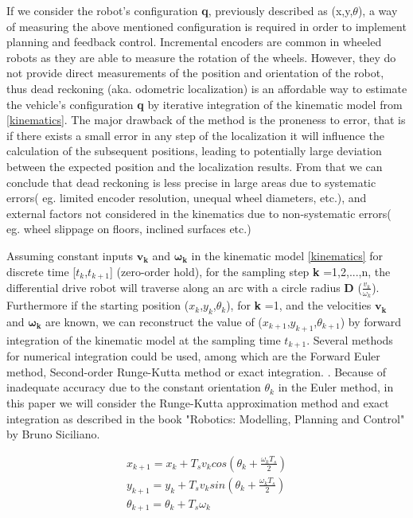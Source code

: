 If we consider the robot's configuration \textbf{q}, previously described as (x,y,$\theta$), a way of measuring the above mentioned configuration is required in order to implement planning and feedback control. Incremental encoders are common in wheeled robots as they are able to measure the rotation of the wheels. However, they do not provide direct measurements of the position and orientation of the robot, thus dead reckoning (aka. odometric localization) is an affordable way to estimate the vehicle's configuration \textbf{q} by iterative integration of the kinematic model from \ref{kinematics}. The major drawback of the method is the proneness to error, that is if there exists a small error in any step of the localization it will influence the calculation of the subsequent positions, leading to potentially large deviation between the expected position and the localization results. From that we can conclude that dead reckoning is less precise in large areas due to systematic errors( eg. limited encoder resolution, unequal wheel diameters, etc.), and external factors not considered in the kinematics due to non-systematic errors( eg. wheel slippage on floors, inclined surfaces etc.) 

Assuming constant inputs $\boldsymbol{v_k}$ and $\boldsymbol{\omega_k}$ in the kinematic model \ref{kinematics} for discrete time [$t_k$,$t_{k+1}$] (zero-order hold), for the sampling step \textbf{k} =1,2,...,n, the differential drive robot will traverse along an arc with a circle radius \textbf{D} ($\frac{v_k}{\omega_k}$). Furthermore if the starting position ($x_k$,$y_k$,$\theta_k$), for \textbf{k} =1, and the velocities $\boldsymbol{v_k}$ and $\boldsymbol{\omega_k}$ are known, we can reconstruct the value of ($x_{k+1}$,$y_{k+1}$,$\theta_{k+1}$) by forward integration of the kinematic model at the sampling time $t_{k+1}$. Several methods for numerical integration could be used, among which are the Forward Euler method, Second-order Runge-Kutta method or exact integration. . Because of inadequate accuracy due to the constant orientation $\theta_k$ in the Euler method, in this paper we will consider the Runge-Kutta approximation method and exact integration as described in the book "Robotics: Modelling, Planning and Control" by Bruno Siciliano.

\begin{align}
x_{k+1} = x_k + T_s v_k cos(\theta_k + \frac{\omega_k T_s}{2}) \\
y_{k+1} = y_k + T_s v_k sin(\theta_k + \frac{\omega_k T_s}{2}) \label{eq15} \\
\theta_{k+1} = \theta_k + T_s\omega_k  \nonumber 
\end{align}

